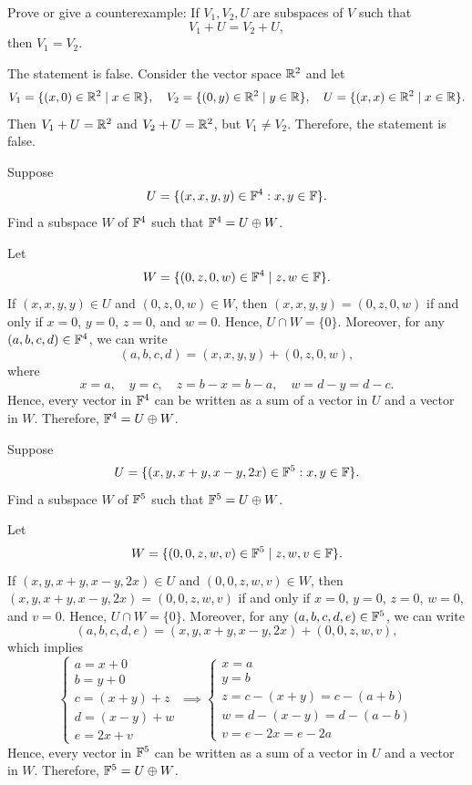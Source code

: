 \begin{exc}
\begin{exercise}
Prove or give a counterexample: If $V_1,V_2,U$ are subspaces of $V$ such that
\[ V_1+U = V_2+U, \]
then $V_1=V_2$.
\end{exercise}
\begin{solution}
The statement is false. Consider the vector space $\mathbb{R}^2$ and let
\[ V_1 = \{(x,0)\in\mathbb{R}^2 \mid x\in\mathbb{R}\}, \quad
   V_2 = \{(0,y)\in\mathbb{R}^2 \mid y\in\mathbb{R}\}, \quad
   U = \{(x,x)\in\mathbb{R}^2 \mid x\in\mathbb{R}\}. \]
Then $V_1+U=\mathbb{R}^2$ and $V_2+U=\mathbb{R}^2$, but $V_1\ne V_2$. Therefore, the statement
is false.
\end{solution}

\begin{exercise}
Suppose
\[ U = \{(x,x,y,y)\in\mathbb{F}^4 : x,y\in\mathbb{F}\}. \]
Find a subspace $W$ of $\mathbb{F}^4$ such that $\mathbb{F}^4=U\oplus W$.
\end{exercise}
\begin{solution}
Let
\[ W = \{(0,z,0,w)\in\mathbb{F}^4 \mid z,w\in\mathbb{F}\}. \]
If $(x,x,y,y)\in U$ and $(0,z,0,w)\in W$, then $(x,x,y,y)=(0,z,0,w)$ if and
only if $x=0$, $y=0$, $z=0$, and $w=0$. Hence, $U\cap W=\{0\}$. Moreover, for
any $(a,b,c,d)\in\mathbb{F}^4$, we can write
\[ (a,b,c,d) = (x,x,y,y)+(0,z,0,w), \]
where
\[ x=a,\quad y=c,\quad z=b-x=b-a,\quad w=d-y=d-c. \]
Hence, every vector in $\mathbb{F}^4$ can be written as a sum of a vector in $U$ and a
vector in $W$. Therefore, $\mathbb{F}^4=U\oplus W$.
\end{solution}

\begin{exercise}
Suppose
\[ U = \{(x,y,x+y,x-y,2x)\in\mathbb{F}^5 : x,y\in\mathbb{F}\}. \]
Find a subspace $W$ of $\mathbb{F}^5$ such that $\mathbb{F}^5=U\oplus W$.
\end{exercise}
\begin{solution}
Let
\[ W = \{(0,0,z,w,v)\in\mathbb{F}^5 \mid z,w,v\in\mathbb{F}\}. \]
If $(x,y,x+y,x-y,2x)\in U$ and $(0,0,z,w,v)\in W$, then
$(x,y,x+y,x-y,2x)=(0,0,z,w,v)$ if and only if $x=0$, $y=0$, $z=0$, $w=0$, and
$v=0$. Hence, $U\cap W=\{0\}$. Moreover, for any $(a,b,c,d,e)\in\mathbb{F}^5$, we can
write
\[ (a,b,c,d,e) = (x,y,x+y,x-y,2x)+(0,0,z,w,v), \]
which implies
\[ \begin{cases} a=x+0\\ b=y+0\\ c=(x+y)+z\\ d=(x-y)+w\\ e=2x+v \end{cases}
   \implies
   \begin{cases} x=a\\ y=b\\ z=c-(x+y)=c-(a+b)\\ w=d-(x-y)=d-(a-b)\\
     v=e-2x=e-2a \end{cases} \]
Hence, every vector in $\mathbb{F}^5$ can be written as a sum of a vector in $U$ and a
vector in $W$. Therefore, $\mathbb{F}^5=U\oplus W$.
\end{solution}


\end{exc}
